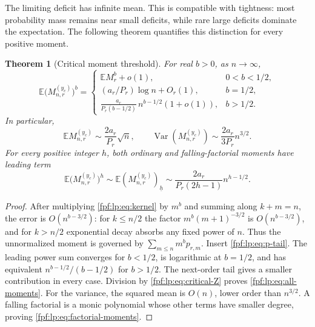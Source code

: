 \documentclass[11pt]{article}
\numberwithin{equation}{section}
\newtheorem{theorem}{Theorem}[section]
\theoremstyle{definition}
\newcommand{\E}{\mathbb E}
\newcommand{\fall}[2]{(#1)_{\underline{#2}}}
\newcommand{\Var}{\operatorname{Var}}
\begin{document}
The limiting deficit has infinite mean. This is compatible with tightness:
most probability mass remains near small deficits, while rare large
deficits dominate the expectation. The following theorem quantifies
this distinction for every positive moment.

\begin{theorem}[Critical moment threshold]\label{fpf:lp:thm:moments}
For real \(b>0\), as \(n\to\infty\),
\begin{equation}\label{fpf:lp:eq:all-moments}
 \E\bigl(M_{n,r}^{(y_c)}\bigr)^b=
 \begin{cases}
  \E M_r^b+o(1),&0<b<1/2,\\[2pt]
  (a_r/P_r)\log n+O_r(1),&b=1/2,\\[2pt]
  \displaystyle\frac{a_r}{P_r(b-1/2)}\,n^{b-1/2}(1+o(1)),&b>1/2.
 \end{cases}
\end{equation}
In particular,
\begin{equation}\label{fpf:lp:eq:first-two-moments}
 \E M_{n,r}^{(y_c)}\sim\frac{2a_r}{P_r}\sqrt n,
 \qquad
 \Var(M_{n,r}^{(y_c)})\sim\frac{2a_r}{3P_r}n^{3/2}.
\end{equation}
For every positive integer \(h\), both ordinary and falling-factorial
moments have leading term
\begin{equation}\label{fpf:lp:eq:factorial-moments}
 \E\bigl(M_{n,r}^{(y_c)}\bigr)^h
 \sim\E\fall{M_{n,r}^{(y_c)}}{h}
 \sim\frac{2a_r}{P_r(2h-1)}n^{h-1/2}.
\end{equation}
\end{theorem}
\begin{proof}
After multiplying \eqref{fpf:lp:eq:kernel} by \(m^b\) and summing along
\(k+m=n\), the error is \(O(n^{b-3/2})\): for \(k\le n/2\) the
factor \(m^{b}(m+1)^{-3/2}\) is \(O(n^{b-3/2})\), and for
\(k>n/2\) exponential decay absorbs any fixed power of \(n\).
Thus the unnormalized moment is governed by
\(\sum_{m\le n}m^bp_{r,m}\). Insert \eqref{fpf:lp:eq:p-tail}. The leading
power sum converges for \(b<1/2\), is logarithmic at \(b=1/2\), and
has equivalent \(n^{b-1/2}/(b-1/2)\) for \(b>1/2\). The next-order
tail gives a smaller contribution in every case. Division by
\eqref{fpf:lp:eq:critical-Z} proves \eqref{fpf:lp:eq:all-moments}.
For the variance, the squared mean is \(O(n)\), lower order than
\(n^{3/2}\). A falling factorial is a monic polynomial whose other
terms have smaller degree, proving \eqref{fpf:lp:eq:factorial-moments}.
\end{proof}
\end{document}
